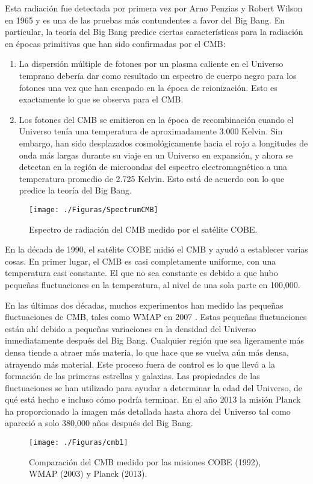 \documentclass[a4paper,openright,12pt]{book}
\begin{document}
Esta radiación fue detectada por primera vez por Arno Penzias y Robert Wilson \cite{1.1.2.1} en 1965 y es una de las pruebas más contundentes a favor del Big Bang. En particular, la teoría del Big Bang predice ciertas características para la radiación en épocas primitivas que han sido confirmadas por el CMB:

\begin{enumerate}
\item La dispersión múltiple de fotones por un plasma caliente en el Universo temprano debería dar como resultado un espectro de cuerpo negro para los fotones una vez que han escapado en la época de reionización. Esto es exactamente lo que se observa para el CMB.
\item Los fotones del CMB se emitieron en la época de recombinación cuando el Universo tenía una temperatura de aproximadamente 3.000 Kelvin. Sin embargo, han sido desplazados cosmológicamente hacia el rojo a longitudes de onda más largas durante su viaje en un Universo en expansión, y ahora se detectan en la región de microondas del espectro electromagnético a una temperatura promedio de 2.725 Kelvin. Esto está de acuerdo con lo que predice la teoría del Big Bang. 
\end{enumerate}
\begin{figure}
\centering
  \texttt{[image: ./Figuras/SpectrumCMB]}
  \caption{\footnotesize{Espectro de radiación del CMB medido por el satélite COBE.}}
  \label{fig 1.3}
\end{figure}
En la década de 1990, el satélite COBE midió el CMB  y ayudó a establecer varias cosas. En primer lugar, el CMB es casi completamente uniforme, con una temperatura casi constante. El que no sea constante es debido a que hubo pequeñas fluctuaciones en la temperatura, al nivel de una sola parte en 100,000. 

En las últimas dos décadas, muchos experimentos han medido las pequeñas fluctuaciones de CMB, tales como WMAP en 2007 \cite{1.1.3} . Estas pequeñas fluctuaciones están ahí debido a pequeñas variaciones en la densidad del Universo inmediatamente después del Big Bang. Cualquier región que sea ligeramente más densa tiende a atraer más materia, lo que hace que se vuelva aún más densa, atrayendo más material. Este proceso fuera de control es lo que llevó a la formación de las primeras estrellas y galaxias. Las propiedades de las fluctuaciones se han utilizado para ayudar a determinar la edad del Universo, de qué está hecho e incluso cómo podría terminar. En el año 2013 la misión Planck \cite{1.1.4} ha proporcionado la imagen más detallada hasta ahora del Universo tal como apareció a solo 380,000 años después del Big Bang.
\begin{figure}
\centering
  \texttt{[image: ./Figuras/cmb1]}
  \caption{\footnotesize{Comparación del CMB medido por las misiones COBE (1992), WMAP (2003) y Planck (2013).}}
  \label{fig 1.4}
\end{figure}
\end{document}
